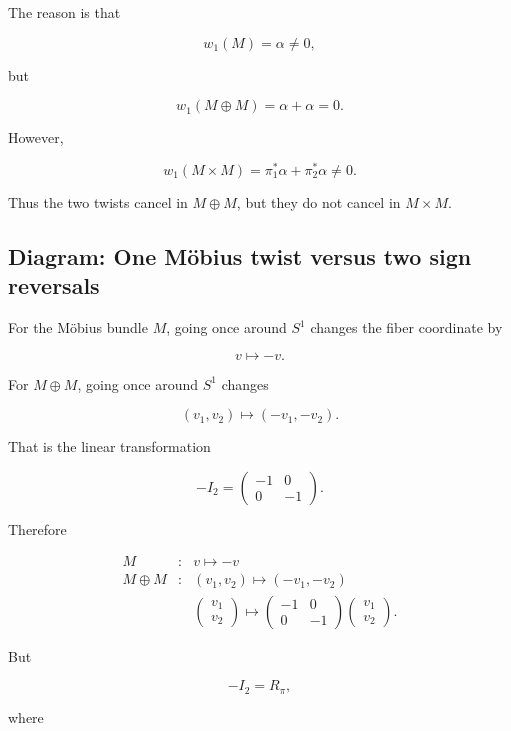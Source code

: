 \documentclass[12pt,a4paper]{article}
\theoremstyle{notespace}
\begin{document}
	The reason is that
	
	\[
	w_{1}(M)=\alpha\neq 0,
	\]
	
	but
	
	\[
	w_{1}(M\oplus M)
	=
	\alpha+\alpha
	=
	0.
	\]
	
	However,
	
	\[
	w_{1}(M\times M)
	=
	\pi_{1}^{*}\alpha+\pi_{2}^{*}\alpha
	\neq 0.
	\]
	
	Thus the two twists cancel in \(M\oplus M\), but they do not cancel in \(M\times M\).
	
	\subsection{Diagram: One M\"obius twist versus two sign reversals}
	
	For the M\"obius bundle \(M\), going once around \(S^{1}\) changes the fiber coordinate by
	
	\[
	v\longmapsto -v.
	\]
	
	For \(M\oplus M\), going once around \(S^{1}\) changes
	
	\[
	(v_{1},v_{2})\longmapsto (-v_{1},-v_{2}).
	\]
	
	That is the linear transformation
	
	\[
	-I_{2}
	=
	\begin{pmatrix}
		-1&0\\
		0&-1
	\end{pmatrix}.
	\]
	
	Therefore
	
	\[
	\begin{array}{ccl}
		M &:& v\longmapsto -v\\[6pt]
		M\oplus M &:& (v_{1},v_{2})\longmapsto (-v_{1},-v_{2})\\[6pt]
		&&
		\begin{pmatrix}
			v_{1}\\
			v_{2}
		\end{pmatrix}
		\longmapsto
		\begin{pmatrix}
			-1&0\\
			0&-1
		\end{pmatrix}
		\begin{pmatrix}
			v_{1}\\
			v_{2}
		\end{pmatrix}.
	\end{array}
	\]
	
	But
	
	\[
	-I_{2}=R_{\pi},
	\]
	
	where
	
\end{document}
